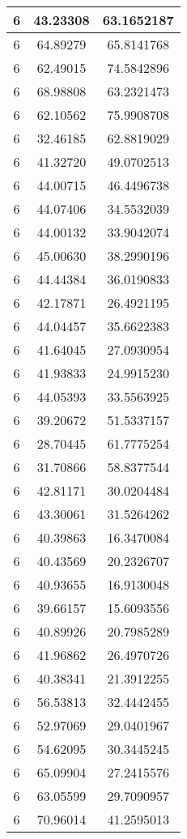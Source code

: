 \documentclass[
]{book}
\begin{document}
\begin{tabular}{c|c|c}
\hline
6 & 43.23308 & 63.1652187\\
\hline
6 & 64.89279 & 65.8141768\\
\hline
6 & 62.49015 & 74.5842896\\
\hline
6 & 68.98808 & 63.2321473\\
\hline
6 & 62.10562 & 75.9908708\\
\hline
6 & 32.46185 & 62.8819029\\
\hline
6 & 41.32720 & 49.0702513\\
\hline
6 & 44.00715 & 46.4496738\\
\hline
6 & 44.07406 & 34.5532039\\
\hline
6 & 44.00132 & 33.9042074\\
\hline
6 & 45.00630 & 38.2990196\\
\hline
6 & 44.44384 & 36.0190833\\
\hline
6 & 42.17871 & 26.4921195\\
\hline
6 & 44.04457 & 35.6622383\\
\hline
6 & 41.64045 & 27.0930954\\
\hline
6 & 41.93833 & 24.9915230\\
\hline
6 & 44.05393 & 33.5563925\\
\hline
6 & 39.20672 & 51.5337157\\
\hline
6 & 28.70445 & 61.7775254\\
\hline
6 & 31.70866 & 58.8377544\\
\hline
6 & 42.81171 & 30.0204484\\
\hline
6 & 43.30061 & 31.5264262\\
\hline
6 & 40.39863 & 16.3470084\\
\hline
6 & 40.43569 & 20.2326707\\
\hline
6 & 40.93655 & 16.9130048\\
\hline
6 & 39.66157 & 15.6093556\\
\hline
6 & 40.89926 & 20.7985289\\
\hline
6 & 41.96862 & 26.4970726\\
\hline
6 & 40.38341 & 21.3912255\\
\hline
6 & 56.53813 & 32.4442455\\
\hline
6 & 52.97069 & 29.0401967\\
\hline
6 & 54.62095 & 30.3445245\\
\hline
6 & 65.09904 & 27.2415576\\
\hline
6 & 63.05599 & 29.7090957\\
\hline
6 & 70.96014 & 41.2595013\\

\end{tabular}
\end{document}
